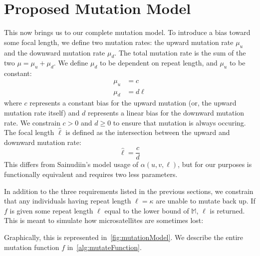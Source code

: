 \section{Proposed Mutation Model}\label{sec:proposedMutationModel}
This now brings us to our complete mutation model.
To introduce a bias toward some focal length, we define two mutation rates: the upward mutation rate $\mu_u$ and the
downward mutation rate $\mu_d$.
The total mutation rate is the sum of the two $\mu = \mu_u + \mu_d$.
We define $\mu_d$ to be dependent on repeat length, and $\mu_u$ to be constant:
\begin{align}
    \mu_u &= c \\
    \mu_d &= d\ell
\end{align}
where $c$ represents a constant bias for the upward mutation (or, the upward mutation rate itself) and $d$ represents a
linear bias for the downward mutation rate.
We constrain $c > 0$ and $d \geq 0$ to ensure that mutation is always occuring.
The focal length $\hat{\ell}$ is defined as the intersection between the upward and downward mutation rate:
\begin{equation}
    \hat{\ell} = \frac{c}{d}
\end{equation}
This differs from Sainudiin's model usage of $\alpha(u, v, \ell)$, but for our purposes is functionally equivalent and
requires two less parameters.

In addition to the three requirements listed in the previous sections, we constrain that any individuals having repeat
length $\ell = \kappa$ are unable to mutate back up.
If $f$ is given some repeat length $\ell$ equal to the lower bound of $\mathbb{M}$, $\ell$ is returned.
This is meant to simulate how microsatellites are sometimes lost:

Graphically, this is represented in~\autoref{fig:mutationModel}.
We describe the entire mutation function $f$ in~\autoref{alg:mutateFunction}.
